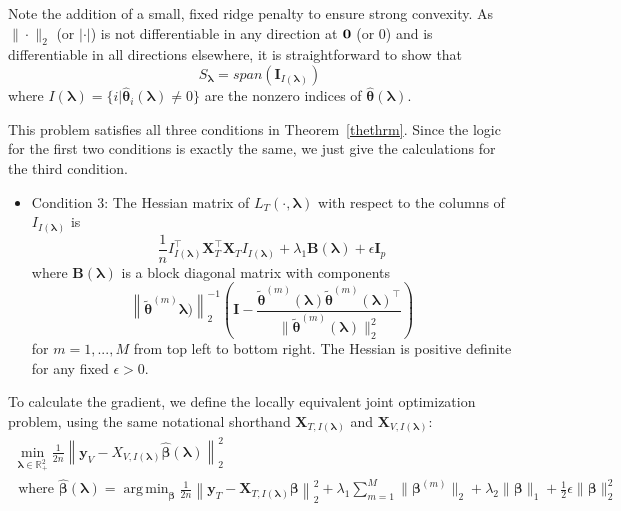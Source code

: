 \documentclass[10pt,letterpaper]{article}
\DeclareMathOperator*{\argmin}{arg\,min}
\begin{document}
Note the addition of a small, fixed ridge penalty to ensure strong convexity. As $\|\cdot\|_2$ (or $|\cdot|$) is not differentiable in any direction at ${\bf 0}$ (or $0$) and is differentiable in all directions elsewhere, it is straightforward to show that 
\begin{equation}
S_{\boldsymbol \lambda} = span(\boldsymbol I_{I(\boldsymbol\lambda)})
\end{equation}
where $I(\boldsymbol\lambda) = \{i | \hat{\boldsymbol{\theta}}_i(\boldsymbol\lambda) \ne 0\}$ are the nonzero indices of $\hat{\boldsymbol{\theta}}(\boldsymbol{\lambda})$. 

This problem satisfies all three conditions in Theorem~\ref{thethrm}. Since the logic for the first two conditions is exactly the same, we just give the calculations for the third condition.

\begin{itemize}
\item[] Condition 3: The Hessian matrix of $L_T(\cdot, \boldsymbol{\lambda})$ with respect to the columns of $I_{I(\boldsymbol \lambda)}$ is
\begin{equation}
\frac{1}{n} I_{I(\boldsymbol \lambda)}^\top \boldsymbol{X}_{T}^\top \boldsymbol{X}_{T} I_{I(\boldsymbol \lambda)}
+ \lambda_1 \boldsymbol{B}(\boldsymbol\lambda)
+ \epsilon \boldsymbol I_p
\end{equation}
where $\boldsymbol{B}(\boldsymbol\lambda)$ is a block diagonal matrix with components 
\begin{equation}
\left \| \tilde{\boldsymbol{\theta}}^{(m)}
\boldsymbol{\lambda})\right\|_2^{-1} 
\left (
\boldsymbol{I} - 
\frac{\tilde{\boldsymbol{\theta}}^{(m)}(\boldsymbol{\lambda})\tilde{\boldsymbol{\theta}}^{(m)}(\boldsymbol{\lambda})^\top}{\|\tilde{\boldsymbol{\theta}}^{(m)}(\boldsymbol{\lambda})\|_2^2}
\right)
\end{equation}
for $m=1,...,M$ from top left to bottom right. The Hessian is positive definite for any fixed $\epsilon > 0$.
\hfill {}
\end{itemize}

To calculate the gradient, we define the locally equivalent joint optimization problem, using the same notational shorthand $\boldsymbol{X}_{T, I(\boldsymbol\lambda)}$ and $\boldsymbol{X}_{V, I(\boldsymbol\lambda)}$:
\begin{equation}
\begin{array}{c}
\min_{\boldsymbol{\lambda} \in \mathbb{R}^2_{+}} \frac{1}{2n} \left \| \boldsymbol{y}_V - X_{V,I(\boldsymbol\lambda)} \hat{\boldsymbol\beta}(\boldsymbol{\lambda}) \right \|^2_2 \\
\text{ where }
\hat{\boldsymbol{\beta}}(\boldsymbol{\lambda}) = \argmin_{\boldsymbol \beta}
\frac{1}{2n} \left \| \boldsymbol{y}_T - \boldsymbol{X}_{T, I(\boldsymbol\lambda)} \boldsymbol \beta \right \|^2_2
+ \lambda_1 \sum_{m=1}^M \| \boldsymbol \beta^{(m)} \|_2
+ \lambda_2 \| \boldsymbol \beta \|_1
+ \frac{1}{2}\epsilon \| \boldsymbol \beta \|_2^2
\end{array}
\end{equation}
\end{document}
